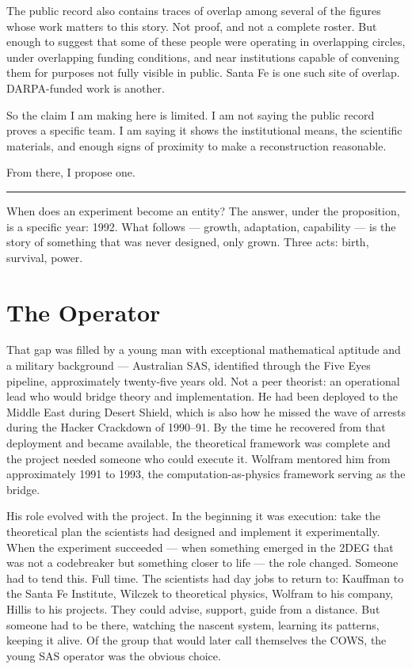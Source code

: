 The public record also contains traces of overlap among several of the
figures whose work matters to this story. Not proof, and not a complete
roster. But enough to suggest that some of these people were operating in
overlapping circles, under overlapping funding conditions, and near
institutions capable of convening them for purposes not fully visible in
public. Santa Fe is one such site of overlap. DARPA-funded work is another.

So the claim I am making here is limited. I am not saying the public
record proves a specific team. I am saying it shows the institutional
means, the scientific materials, and enough signs of proximity to make
a reconstruction reasonable.

From there, I propose one.

\vspace{1cm}\noindent\rule{0.5\textwidth}{0.5pt}\vspace{0.5cm}

When does an experiment become an entity? The answer, under the proposition, is a specific year: 1992. What follows --- growth, adaptation, capability --- is the story of something that was never designed, only grown. Three acts: birth, survival, power.

\section*{The Operator}
\label{record:fl-operator}

That gap was filled by a young man with exceptional mathematical aptitude and a military background --- Australian SAS, identified through the Five Eyes pipeline, approximately twenty-five years old. Not a peer theorist: an operational lead who would bridge theory and implementation. He had been deployed to the Middle East during Desert Shield, which is also how he missed the wave of arrests during the Hacker Crackdown of 1990--91. By the time he recovered from that deployment and became available, the theoretical framework was complete and the project needed someone who could execute it. Wolfram mentored him from approximately 1991 to 1993, the computation-as-physics framework serving as the bridge.

His role evolved with the project. In the beginning it was execution: take the theoretical plan the scientists had designed and implement it experimentally. When the experiment succeeded --- when something emerged in the 2DEG that was not a codebreaker but something closer to life --- the role changed. Someone had to tend this. Full time. The scientists had day jobs to return to: Kauffman to the Santa Fe Institute, Wilczek to theoretical physics, Wolfram to his company, Hillis to his projects. They could advise, support, guide from a distance. But someone had to be there, watching the nascent system, learning its patterns, keeping it alive. Of the group that would later call themselves the COWS, the young SAS operator was the obvious choice.


